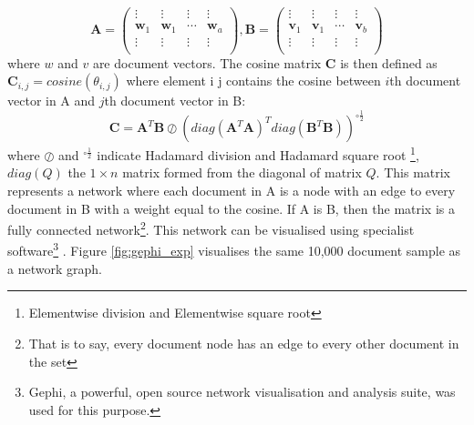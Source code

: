 $$\mathbf{A} = \left( \begin{array}{cccc}
\vdots & \vdots & \vdots & \vdots \\
\mathbf{w}_1 & \mathbf{w}_1 & \cdots & \mathbf{w}_a \\
\vdots & \vdots & \vdots & \vdots \\ \end{array} \right) , \mathbf{B} = \left( \begin{array}{cccc}
\vdots & \vdots & \vdots & \vdots \\
\mathbf{v}_1 & \mathbf{v}_1 & \cdots & \mathbf{v}_b \\
\vdots & \vdots & \vdots & \vdots \\ \end{array} \right)$$ where $w$ and $v$ are document vectors.
The cosine matrix $\mathbf{C}$ is then defined as $\mathbf{C}_{i , j} = cosine \left(\theta_{i , j} \right)$ where element i j contains the cosine between $i$th document vector in A and $j$th document vector in B:
$$\mathbf{C}=\mathbf{A}^T \mathbf{B} \oslash \left( diag(\mathbf{A}^T \mathbf{A})^T diag(\mathbf{B}^T \mathbf{B}) \right)^{\circ\frac12}$$
where $\oslash$ and $^{\circ\frac12}$ indicate Hadamard division and Hadamard square root \footnote{Elementwise division and Elementwise square root}, $diag(Q)$ the $1 \times n$ matrix formed from the diagonal of matrix $Q$. This matrix represents a network where each document in A is a node with an edge to every document in B with a weight equal to the cosine. If A is B, then the matrix is a fully connected network\footnote{That is to say, every document node has an edge to every other document in the set}. This network can be visualised using specialist software\footnote{Gephi, a powerful, open source network visualisation and analysis suite, was used for this purpose. } \cite{gephi}. Figure \ref{fig:gephi_exp} visualises the same 10,000 document sample as a network graph.

